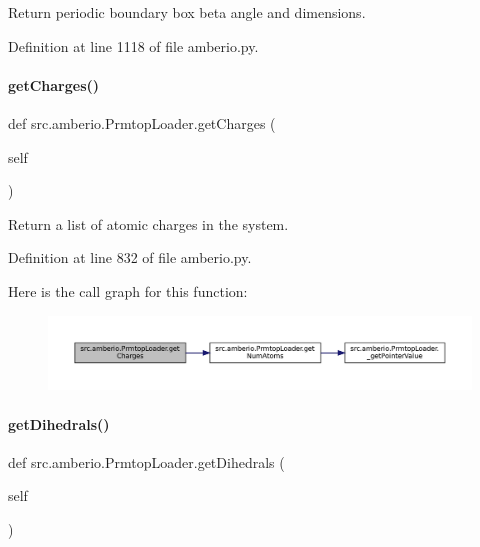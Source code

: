 Return periodic boundary box beta angle and dimensions. 



Definition at line 1118 of file amberio.\+py.

\mbox{\label{classsrc_1_1amberio_1_1PrmtopLoader_a7dae0918b1f2fb6c956c044198bba7a6}} 
\paragraph{\texorpdfstring{get\+Charges()}{getCharges()}}
{\footnotesize\ttfamily def src.\+amberio.\+Prmtop\+Loader.\+get\+Charges (\begin{DoxyParamCaption}\item[{}]{self }\end{DoxyParamCaption})}



Return a list of atomic charges in the system. 



Definition at line 832 of file amberio.\+py.

Here is the call graph for this function\+:
\nopagebreak
\begin{figure}[H]
\begin{center}
\leavevmode
\includegraphics[width=350pt]{classsrc_1_1amberio_1_1PrmtopLoader_a7dae0918b1f2fb6c956c044198bba7a6_cgraph}
\end{center}
\end{figure}
\mbox{\label{classsrc_1_1amberio_1_1PrmtopLoader_a24dfb8d7303f2e04a6617589ce59d7c2}} 
\paragraph{\texorpdfstring{get\+Dihedrals()}{getDihedrals()}}
{\footnotesize\ttfamily def src.\+amberio.\+Prmtop\+Loader.\+get\+Dihedrals (\begin{DoxyParamCaption}\item[{}]{self }\end{DoxyParamCaption})}



